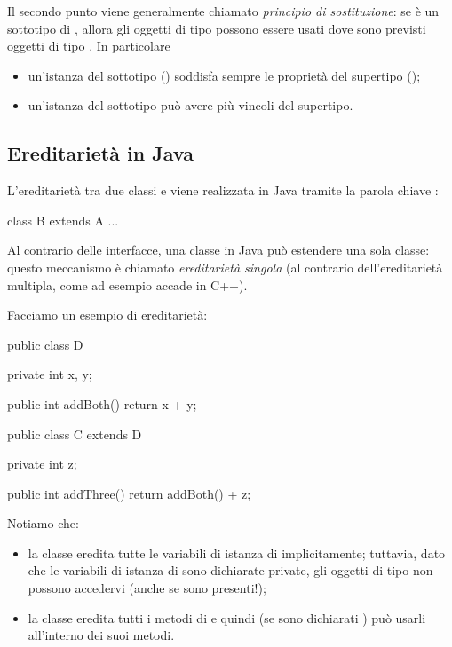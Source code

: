 Il secondo punto viene generalmente chiamato \emph{principio di sostituzione}: se  è un sottotipo di , allora gli oggetti di tipo  possono essere usati dove sono previsti oggetti di tipo . In particolare \begin{itemize}
    \item un'istanza del sottotipo () soddisfa sempre le proprietà del supertipo ();
    \item un'istanza del sottotipo può avere più vincoli del supertipo.
\end{itemize}

\subsection{Ereditarietà in Java}

L'ereditarietà tra due classi  e  viene realizzata in Java tramite la parola chiave :
\begin{Java}
    class B extends A {...}
\end{Java}

Al contrario delle interfacce, una classe in Java può estendere una sola classe: questo meccanismo è chiamato \emph{ereditarietà singola} (al contrario dell'ereditarietà multipla, come ad esempio accade in C++).

Facciamo un esempio di ereditarietà:
\begin{Java}
    public class D {
        private int x, y;

        public int addBoth(){
            return x + y;
        }
    }

    public class C extends D {
        private int z;

        public int addThree(){
            return addBoth() + z;
        }
    }
\end{Java}

Notiamo che:
\begin{itemize}
    \item la classe  eredita tutte le variabili di istanza di  implicitamente; tuttavia, dato che le variabili di istanza di  sono dichiarate private, gli oggetti di tipo  non possono accedervi (anche se sono presenti!);
    \item la classe  eredita tutti i metodi di  e quindi (se sono dichiarati ) può usarli all'interno dei suoi metodi.
\end{itemize}

